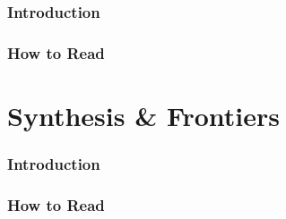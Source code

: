\documentclass[12pt, oneside, openany]{book}
\begin{document}
\section*{Introduction}
\section*{How to Read}
\part{Synthesis \& Frontiers}
\section*{Introduction}
\section*{How to Read}



\end{document}
